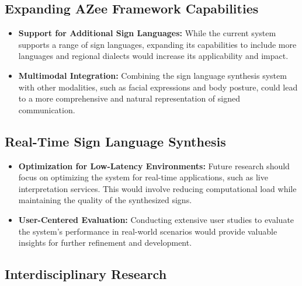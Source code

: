 \documentclass[../../main.tex]{subfiles}
\begin{document}
\subsection{Expanding AZee Framework Capabilities}
\label{ch:conclusion:future:azee}

\begin{itemize}
    \item \textbf{Support for Additional Sign Languages:} While the current system supports a range of sign languages, expanding its capabilities to include more languages and regional dialects would increase its applicability and impact.
    
    \item \textbf{Multimodal Integration:} Combining the sign language synthesis system with other modalities, such as facial expressions and body posture, could lead to a more comprehensive and natural representation of signed communication.
\end{itemize}

\subsection{Real-Time Sign Language Synthesis}
\label{ch:conclusion:future:realtime}

\begin{itemize}
    \item \textbf{Optimization for Low-Latency Environments:} Future research should focus on optimizing the system for real-time applications, such as live interpretation services. This would involve reducing computational load while maintaining the quality of the synthesized signs.
    
    \item \textbf{User-Centered Evaluation:} Conducting extensive user studies to evaluate the system’s performance in real-world scenarios would provide valuable insights for further refinement and development.
\end{itemize}

\subsection{Interdisciplinary Research}
\label{ch:conclusion:future:interdisciplinary}
\end{document}
